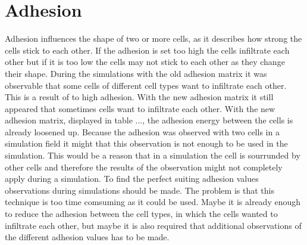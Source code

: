 \section{Adhesion}
Adhesion influences the shape of two or more cells, as it describes how strong the cells stick to each other. If the adhesion is set too high the cells infiltrate each other but if it is too low the cells may not stick to each other as they change their shape. During the simulations with the old adhesion matrix it was observable that some cells of different cell types want to infiltrate each other. This is a result of to high adhesion. With the new adhesion matrix it still appeared that sometimes cells want to infiltrate each other. With the new adhesion matrix, displayed in table ..., the adhesion energy between the cells is already loosened up. Because the adhesion was observed with two cells in a simulation field it might that this observation is not enough to be used in the simulation. This would be a reason that in a simulation the cell is sourrunded by other cells and therefore the results of the observation might not completely apply during a simulation. To find the perfect suiting adhesion values observations during simulations should be made. The problem is that this technique is too time comsuming as it could be used. Maybe it is already enough to reduce the adhesion between the cell types, in which the cells wanted to infiltrate each other, but maybe it is also required that additional observations of the different adhesion values has to be made.

